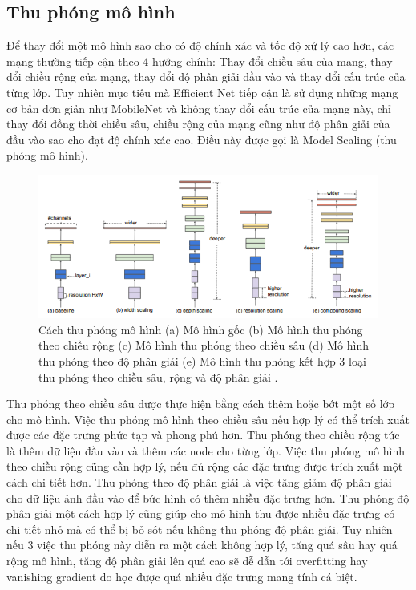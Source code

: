 \subsection{Thu phóng mô hình}
Để thay đổi một mô hình sao cho có độ chính xác và tốc độ xử lý cao hơn, các mạng thường tiếp cận theo 4 hướng chính: Thay đổi chiều sâu của mạng, thay đổi chiều rộng của mạng, thay đổi độ phân giải đầu vào và thay đổi cấu trúc của từng lớp. Tuy nhiên mục tiêu mà Efficient Net tiếp cận là sử dụng những mạng cơ bản đơn giản như MobileNet và không thay đổi cấu trúc của mạng này, chỉ thay đổi đồng thời chiều sâu, chiều rộng của mạng cũng như độ phân giải của đầu vào sao cho đạt độ chính xác cao. Điều này được gọi là Model Scaling (thu phóng mô hình).\par
\begin{figure}[ht!]
\centerline{\includegraphics[scale=0.7]{images/eff2.png}}
\caption{ Cách thu phóng mô hình (a) Mô hình gốc (b) Mô hình thu phóng theo chiều rộng (c) Mô hình thu phóng theo chiều sâu
(d) Mô hình thu phóng theo độ phân giải
(e) Mô hình thu phóng kết hợp 3 loại thu phóng theo chiều sâu, rộng và độ phân giải
\cite{efficientnet:2020}.}
\label{fig:eff2}
\end{figure}
Thu phóng theo chiều sâu được thực hiện bằng cách thêm hoặc bớt một số lớp cho mô hình. Việc thu phóng mô hình theo chiều sâu nếu hợp lý có thể trích xuất được các đặc trưng phức tạp và phong phú hơn. Thu phóng theo chiều rộng tức là thêm dữ liệu đầu vào và thêm các node cho từng lớp. Việc thu phóng mô hình theo chiều rộng cũng cần hợp lý, nếu đủ rộng các đặc trưng được trích xuất một cách chi tiết hơn. Thu phóng theo độ phân giải là việc tăng giảm độ phân giải cho dữ liệu ảnh đầu vào để bức hình có thêm nhiều đặc trưng hơn. Thu phóng độ phân giải một cách hợp lý cũng giúp cho mô hình thu được nhiều đặc trưng có chi tiết nhỏ mà có thể bị bỏ sót nếu không thu phóng độ phân giải. Tuy nhiên nếu 3 việc thu phóng này diễn ra một cách không hợp lý, tăng quá sâu hay quá rộng mô hình, tăng độ phân giải lên quá cao sẽ dễ dẫn tới overfitting hay vanishing gradient do học được quá nhiều đặc trưng mang tính cá biệt.\par
